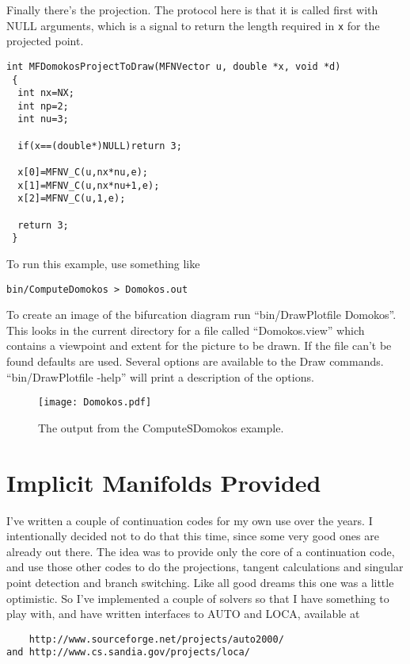 \documentclass[12pt]{article}
\begin{document}
Finally there's the projection. The protocol here is that it is called first with NULL arguments, which is a signal to return 
the length required in {\tt x} for the projected point.
\begin{verbatim}
int MFDomokosProjectToDraw(MFNVector u, double *x, void *d)
 {
  int nx=NX;
  int np=2;
  int nu=3;

  if(x==(double*)NULL)return 3;

  x[0]=MFNV_C(u,nx*nu,e);
  x[1]=MFNV_C(u,nx*nu+1,e);
  x[2]=MFNV_C(u,1,e);

  return 3;
 }
\end{verbatim}

To run this example, use something like
\begin{verbatim}
bin/ComputeDomokos > Domokos.out
\end{verbatim}

To create an image of the bifurcation diagram run ``{bin/DrawPlotfile Domokos}''. This looks in the current directory for a file
called ``{Domokos.view}'' which contains a viewpoint and extent for the picture to be drawn. If the file can't
be found defaults are used. Several options are available to the Draw commands. ``{bin/DrawPlotfile -help}'' will
print a description of the options.

  \begin{figure}
   \begin{center}
    \texttt{[image: Domokos.pdf]}
   \end{center}
   \caption{The output from the {ComputeSDomokos} example.}
  \end{figure}


\section{Implicit Manifolds Provided}

I've written a couple of continuation codes for my own use over the years. I intentionally decided not to do that this time,
since some very good ones are already out there. The idea was to provide only the core of a continuation code, and use those
other codes to do the projections, tangent calculations and singular point detection and branch switching. Like all good dreams
this one was a little optimistic. So I've implemented a couple of solvers so that I have something to play with, and have 
written interfaces to AUTO and LOCA, available at
\begin{verbatim}
    http://www.sourceforge.net/projects/auto2000/
and http://www.cs.sandia.gov/projects/loca/
\end{verbatim}
\end{document}
